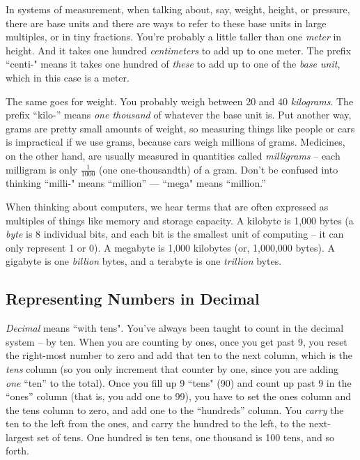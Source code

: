 In systems of measurement, when talking about, say, weight, height, or pressure, there are base units and there are ways to refer to these base units in large multiples, or in tiny fractions. You're probably a little taller than one \emph{meter} in height. And it takes one hundred \emph{centimeters} to add up to one meter. The prefix ``centi-" means it takes one hundred of \emph{these} to add up to one of the \emph{base unit}, which in this case is a meter.

The same goes for weight. You probably weigh between 20 and 40 \emph{kilograms}. The prefix ``{kilo-}'' means \emph{one thousand} of whatever the base unit is. Put another way, grams are pretty small amounts of weight, so measuring things like people or cars is impractical if we use grams, because cars weigh millions of grams. Medicines, on the other hand,  are usually measured in quantities called \emph{milligrams} -- each milligram is only $\frac{1}{1000}$ (one one-thousandth) of a gram. Don't be confused into thinking ``milli-" means ``million'' --- ``mega" means ``million.''

When thinking about computers, we hear terms that are often expressed as multiples of things like memory and storage capacity. A kilobyte is 1,000 bytes (a \emph{byte} is 8 individual bits, and each bit is the smallest unit of computing -- it can only represent 1 or 0). A megabyte is 1,000 kilobytes (or, 1,000,000 bytes). A gigabyte is one \emph{billion} bytes, and a terabyte is one \emph{trillion} bytes. 


\newpage
\subsection*{Representing Numbers in Decimal}

\emph{Decimal} means ``with tens". You've always been taught to count in the decimal system -- by ten. When you are counting by ones, once you get past 9, you reset the right-most number to zero and add that ten to the next column, which is the \emph{tens} column (so you only increment that counter by one, since you are adding \emph{one} ``ten'' to the total). Once you fill up 9 ``tens" (90) and count up past 9 in the ``ones'' column (that is, you add one to 99), you have to set the ones column and the tens column to zero, and add one to the ``hundreds'' column. You \emph{carry} the ten to the left from the ones, and carry the hundred to the left, to the next-largest set of tens. One hundred is ten tens, one thousand is 100 tens, and so forth.

